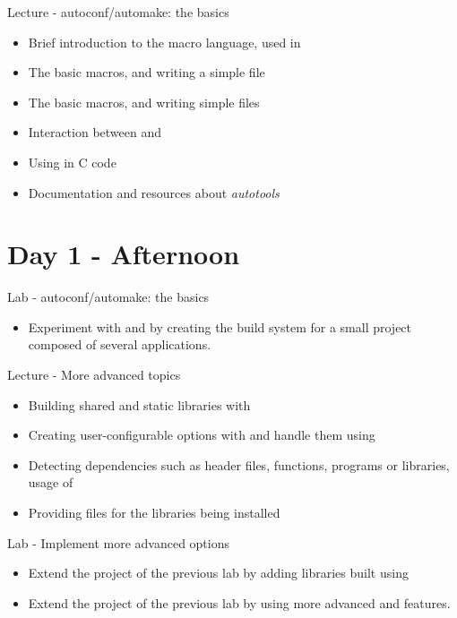 \documentclass[a4paper,12pt,obeyspaces,spaces,hyphens]{article}
\begin{document}
\feagendaonecolumn
{Lecture - autoconf/automake: the basics}
{
  \begin{itemize}
  \item Brief introduction to the  macro language, used in
  \item The basic  macros, and writing a simple
     file
  \item The basic  macros, and writing simple
     files
  \item Interaction between  and 
  \item Using  in C code
  \item Documentation and resources about {\em autotools}
  \end{itemize}
}

\section{Day 1 - Afternoon}

\feagendaonecolumn
{Lab - autoconf/automake: the basics}
{
  \begin{itemize}
  \item Experiment with  and  by creating
    the build system for a small project composed of several applications.
  \end{itemize}
}

\feagendatwocolumn
{Lecture - More advanced topics}
{
  \begin{itemize}
  \item Building shared and static libraries with 
  \item Creating user-configurable options with  and
    handle them using 
  \item Detecting dependencies such as header files, functions,
    programs or libraries, usage of 
  \item Providing  files for the libraries being
    installed
  \end{itemize}
}
{Lab - Implement more advanced options}
{
  \begin{itemize}
  \item Extend the project of the previous lab by adding libraries
    built using 
  \item Extend the project of the previous lab by using more advanced
     and  features.
  \end{itemize}
}
\end{document}
